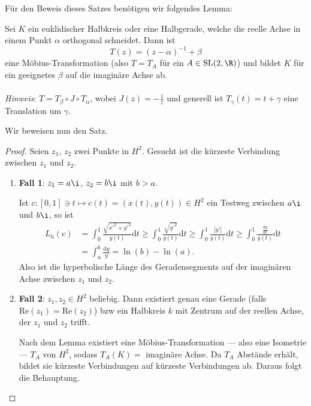Für den Beweis dieses Satzes benötigen wir folgendes Lemma:

\begin{lemma}
  Sei \( K \) ein euklidischer Halbkreis oder eine Halbgerade, welche die reelle Achse in einem Punkt \( \alpha \) orthogonal schneidet. Dann ist
  \begin{equation*}
    T(z) = {(z - \alpha)}^{-1} + \beta
  \end{equation*}
  eine Möbius-Transformation (also \( T = T_A \) für ein \( A \in \text{SL}(2,\R) \)) und bildet \( K \) für ein geeignetes \( \beta \) auf die imaginäre Achse ab. \\
  \  \\
  \emph{Hinweis}: \( T = T_\beta \circ J \circ T_\alpha \), wobei \( J(z) = -\frac{1}{z} \) und generell ist \( T_\gamma(t) = t + \gamma \) eine Translation um \( \gamma \).
\end{lemma}

Wir beweisen nun den Satz.

\begin{proof}
  Seien \( z_1 \), \( z_2 \) zwei Punkte in \( H^2 \). Gesucht ist die kürzeste Verbindung zwischen \( z_1 \) und \( z_2 \).
  \begin{enumerate}
    \item \textbf{Fall 1}: \( z_1 = a\i \), \( z_2 = b\i \) mit \( b > a \).

    Ist \( c : [0,1] \ni t \mapsto c(t) = (x(t), y(t)) \in H^2 \) ein Testweg zwischen \( a\i \) und \( b\i \), so ist
    \begin{align*}
      L_h(c) &= \int_0^1 \frac{\sqrt{x'^2 + y'^2}}{y(t)}\text{d}t \geq \int_0^1 \frac{\sqrt{y'^2}}{y(t)}\text{d}t \geq \int_0^1 \frac{\left\vert y' \right\vert}{y(t)}\text{d}t \geq \int_0^1 \frac{\frac{\text{d}y}{\text{d}t}}{y(t)}\text{d}t \\
       &= \int_a^b \frac{\text{d}y}{y} = \ln(b) - \ln(a)\text{.}
    \end{align*}
    Also ist die hyperbolische Länge des Geradensegments auf der imaginären Achse zwischen \( z_1 \) und \( z_2 \).

    \item \textbf{Fall 2}: \( z_1, z_2 \in H^2 \) beliebig. Dann existiert genau eine Gerade (falls \( \text{Re}(z_1) = \text{Re}(z_2) \)) bzw ein Halbkreis \( k \) mit Zentrum auf der reellen Achse, der \( z_1 \) und \( z_2 \) trifft.

    Nach dem Lemma existiert eine Möbius-Transformation --- also eine Isometrie --- \( T_A \) von \( H^2 \), sodass \( T_A(K) = \) imaginäre Achse. Da \( T_A \) Abstände erhält, bildet sie kürzeste Verbindungen auf kürzeste Verbindungen ab. Daraus folgt die Behauptung.
  \end{enumerate}
\end{proof}

